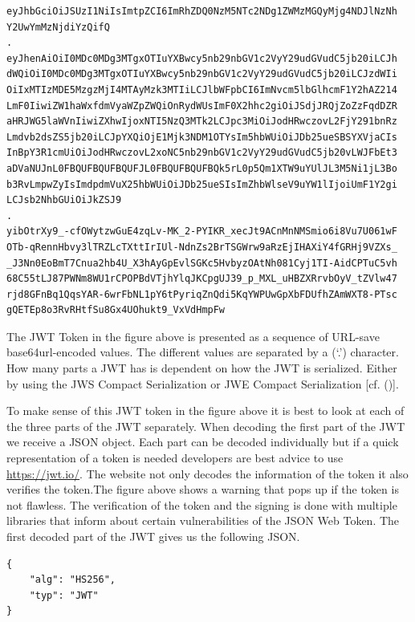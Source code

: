 {\begin{lstlisting}
eyJhbGciOiJSUzI1NiIsImtpZCI6ImRhZDQ0NzM5NTc2NDg1ZWMzMGQyMjg4NDJlNzNh
Y2UwYmMzNjdiYzQifQ
.
eyJhenAiOiI0MDc0MDg3MTgxOTIuYXBwcy5nb29nbGV1c2VyY29udGVudC5jb20iLCJh
dWQiOiI0MDc0MDg3MTgxOTIuYXBwcy5nb29nbGV1c2VyY29udGVudC5jb20iLCJzdWIi
OiIxMTIzMDE5MzgzMjI4MTAyMzk3MTIiLCJlbWFpbCI6ImNvcm5lbGlhcmF1Y2hAZ214
LmF0IiwiZW1haWxfdmVyaWZpZWQiOnRydWUsImF0X2hhc2giOiJSdjJRQjZoZzFqdDZR
aHRJWG5laWVnIiwiZXhwIjoxNTI5NzQ3MTk2LCJpc3MiOiJodHRwczovL2FjY291bnRz
Lmdvb2dsZS5jb20iLCJpYXQiOjE1Mjk3NDM1OTYsIm5hbWUiOiJDb25ueSBSYXVjaCIs
InBpY3R1cmUiOiJodHRwczovL2xoNC5nb29nbGV1c2VyY29udGVudC5jb20vLWJFbEt3
aDVaNUJnL0FBQUFBQUFBQUFJL0FBQUFBQUFBQk5rL0p5Qm1XTW9uYUlJL3M5Ni1jL3Bo
b3RvLmpwZyIsImdpdmVuX25hbWUiOiJDb25ueSIsImZhbWlseV9uYW1lIjoiUmF1Y2gi
LCJsb2NhbGUiOiJkZSJ9
.
yibOtrXy9_-cfOWytzwGuE4zqLv-MK_2-PYIKR_xecJt9ACnMnNMSmio6i8Vu7U061wF
OTb-qRennHbvy3lTRZLcTXttIrIUl-NdnZs2BrTSGWrw9aRzEjIHAXiY4fGRHj9VZXs_
_J3Nn0EoBmT7Cnua2hb4U_X3hAyGpEvlSGKc5HvbyzOAtNh081Cyj1TI-AidCPTuC5vh
68C55tLJ87PWNm8WU1rCPOPBdVTjhYlqJKCpgUJ39_p_MXL_uHBZXRrvbOyV_tZVlw47
rjd8GFnBq1QqsYAR-6wrFbNL1pY6tPyriqZnQdi5KqYWPUwGpXbFDUfhZAmWXT8-PTsc
gQETEp8o3RvRHtfSu8Gx4UOhukt9_VxVdHmpFw
\end{lstlisting}


The JWT Token in the figure above is presented as a sequence of URL-save base64url-encoded values. The different values are separated by a (‘.’) character. How many parts a JWT has is dependent on how the JWT is serialized. Either by using the JWS Compact Serialization or JWE Compact Serialization  [cf. (\cite{JWT:IETF:Jones:2015})].


To make sense of this JWT token in the figure above it is best to look at each of the three parts of the JWT separately. When decoding the first part of the JWT we receive a JSON object. Each part can be decoded individually but if a quick representation of a token is needed developers are best advice to use \href{https://jwt.io/} {https://jwt.io/}. The website not only decodes the information of the token it also verifies the token.The figure above shows a warning that pops up if the token is not flawless. The verification of the token and the signing is done with multiple libraries that inform about certain vulnerabilities of the JSON Web Token. The first decoded part of the JWT gives us the following JSON.


\begin{lstlisting}
{
	"alg": "HS256",
	"typ": "JWT"
}
\end{lstlisting}


}
